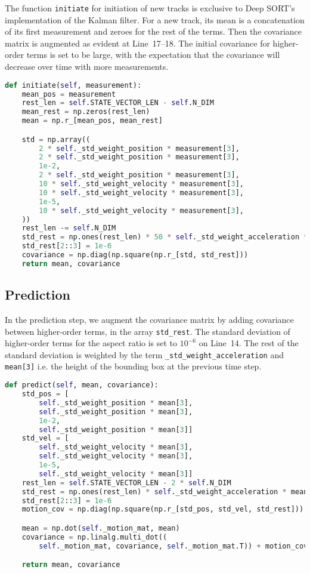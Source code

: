 \documentclass{article}
\numberwithin{algorithm}{section}
\begin{document}
The function \texttt{initiate} for initiation of new tracks is exclusive to Deep SORT's implementation of the Kalman filter. For a new track, its mean is a concatenation of its first measurement and zeroes for the rest of the terms. Then the covariance matrix is augmented as evident at Line~17--18. The initial covariance for higher-order terms is set to be large, with the expectation that the covariance will decrease over time with more measurements.

\begin{lstlisting}[language=Python]
def initiate(self, measurement):
    mean_pos = measurement
    rest_len = self.STATE_VECTOR_LEN - self.N_DIM
    mean_rest = np.zeros(rest_len)
    mean = np.r_[mean_pos, mean_rest]

    std = np.array((
        2 * self._std_weight_position * measurement[3],
        2 * self._std_weight_position * measurement[3],
        1e-2,
        2 * self._std_weight_position * measurement[3],
        10 * self._std_weight_velocity * measurement[3],
        10 * self._std_weight_velocity * measurement[3],
        1e-5,
        10 * self._std_weight_velocity * measurement[3],
    ))
    rest_len -= self.N_DIM
    std_rest = np.ones(rest_len) * 50 * self._std_weight_acceleration * measurement[3]
    std_rest[2::3] = 1e-6
    covariance = np.diag(np.square(np.r_[std, std_rest]))
    return mean, covariance
\end{lstlisting}

\subsection{Prediction}

In the prediction step, we augment the covariance matrix by adding covariance between higher-order terms, in the array \texttt{std\_rest}. The standard deviation of higher-order terms for the aspect ratio is set to $10^{-6}$ on Line~14. The rest of the standard deviation is weighted by the term \texttt{\_std\_weight\_acceleration} and \texttt{mean[3]} i.e. the height of the bounding box at the previous time step.

\begin{lstlisting}[language=Python]
def predict(self, mean, covariance):
    std_pos = [
        self._std_weight_position * mean[3],
        self._std_weight_position * mean[3],
        1e-2,
        self._std_weight_position * mean[3]]
    std_vel = [
        self._std_weight_velocity * mean[3],
        self._std_weight_velocity * mean[3],
        1e-5,
        self._std_weight_velocity * mean[3]]
    rest_len = self.STATE_VECTOR_LEN - 2 * self.N_DIM
    std_rest = np.ones(rest_len) * self._std_weight_acceleration * mean[3]
    std_rest[2::3] = 1e-6
    motion_cov = np.diag(np.square(np.r_[std_pos, std_vel, std_rest]))

    mean = np.dot(self._motion_mat, mean)
    covariance = np.linalg.multi_dot((
        self._motion_mat, covariance, self._motion_mat.T)) + motion_cov

    return mean, covariance
\end{lstlisting}
\end{document}
